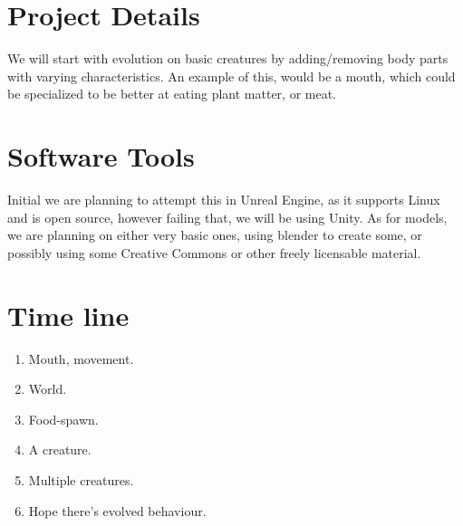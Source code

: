 \documentclass[runningheads]{llncs}
\begin{document}
\section{Project Details}
We will start with evolution on basic creatures by adding/removing body parts with varying characteristics. An example of this, would be a mouth, which could be specialized to be better at eating plant matter, or meat.

\section{Software Tools}
Initial we are planning to attempt this in Unreal Engine, as it supports Linux and is open source, however failing that, we will be using Unity.
As for models, we are planning on either very basic ones, using blender to create some, or possibly using some Creative Commons or other freely licensable material.

\section{Time line}
\begin{enumerate}
\item Mouth, movement.
\item World.
\item Food-spawn.
\item A creature.
\item Multiple creatures.
\item Hope there's evolved behaviour.
\end{enumerate}


%


\end{document}
